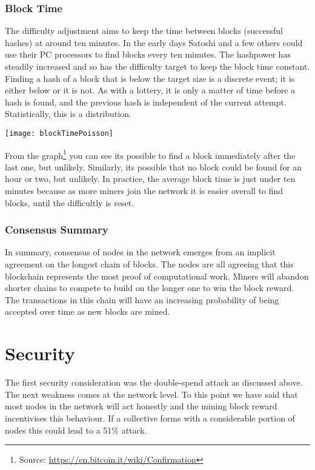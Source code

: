 \subsubsection*{Block Time}
The difficulty adjustment aims to keep the time between blocks (successful hashes) at around ten minutes. In the early days Satoshi and a few others could use their PC processors to find blocks every ten minutes. The hashpower has steadily increased and so has the difficulty target to keep the block time constant. Finding a hash of a block that is below the target size is a discrete event; it is either below or it is not. As with a lottery, it is only a matter of time before a hash is found, and the previous hash is independent of the current attempt. Statistically, this is a  distribution. %

\begin{center}
	\texttt{[image: blockTimePoisson]}
\end{center}

From the graph\footnote{Source: \url{https://en.bitcoin.it/wiki/Confirmation}} you can see its possible to find a block immediately after the last one, but unlikely. Similarly, its possible that no block could be found for an hour or two, but unlikely. In practice, the average block time is just under ten minutes because as more miners join the network it is easier overall to find blocks, until the difficultly is reset. 

\subsubsection*{Consensus Summary}
In summary, consensus of nodes in the network emerges from an implicit agreement on the longest chain of blocks. The nodes are all agreeing that this blockchain represents the most proof of computational work. Miners will abandon shorter chains to compete to build on the longer one to win the block reward. The transactions in this chain will have an increasing probability of being accepted over time as new blocks are mined. 

\section{Security}\label{Se:BCSecurity}
The first security consideration was the double-spend attack as discussed above. The next weakness comes at the network level. To this point we have said that most nodes in the network will act honestly and the mining block reward incentivises this behaviour. If a collective forms with a considerable portion of nodes this could lead to a 51\% attack.

